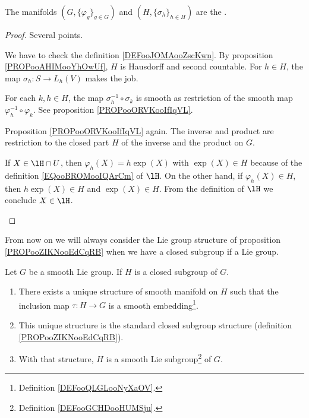 \begin{propositionDef}
	The manifolds \( (G,\{ \varphi_g \}_{g\in G})\) and \( (H,\{ \sigma_h \}_{h\in H})\) are the .
\end{propositionDef}

\begin{proof}
	Several points.
	\begin{subproof}
		We have to check the definition \ref{DEFooJOMAooZscKwn}. By proposition \ref{PROPooAHIMooYhOwUf}, \( H\) is Hausdorff and second countable. For \( h\in H\), the map \(\sigma_h \colon S\to L_h(V)  \) makes the job.

		For each \( k,h\in H\), the map \( \sigma_h^{-1}\circ \sigma_k\) is smooth as restriction of the smooth map \( \varphi_h^{-1}\circ\varphi_k\). See proposition \ref{PROPooORVKooIfIqVL}.

		Proposition \ref{PROPooORVKooIfIqVL} again. The inverse and product are restriction to the closed part \( H\) of the inverse and the product on \( G\).

		If \( X\in \lH\cap U\), then \( \varphi_h(X)=h\exp(X)\) with \( \exp(X)\in H\) because of the definition \eqref{EQooBROMooIQArCm} of \( \lH\). On the other hand, if \( \varphi_h(X)\in H\), then \( h\exp(X)\in H\) and \( \exp(X)\in H\). From the definition of \( \lH\) we conclude \( X\in \lH\).
	\end{subproof}
\end{proof}

\begin{normaltext}
	From now on we will always consider the Lie group structure of proposition \ref{PROPooZIKNooEdCqRB} when we have a closed subgroup if a Lie group.
\end{normaltext}


\begin{theorem}     \label{THOooDEJHooVKJYBL}
	Let \( G\) be a smooth Lie group. If \( H\) is a closed subgroup of \( G\).
	\begin{enumerate}
		\item
		      There exists a unique structure of smooth manifold on \( H\) such that the inclusion map \( \tau\colon H\to G\) is a smooth embedding\footnote{Definition \ref{DEFooQLGLooNyXaOV}.}.
		\item		\label{ITEMooZYPUooLxuCbj}
		      This unique structure is the standard closed subgroup structure (definition \ref{PROPooZIKNooEdCqRB}).
		\item	\label{ITEMooZCFHooJJTLeg}
		      With that structure, \( H\) is a smooth Lie subgroup\footnote{Definition \ref{DEFooGCHDooHUMSju}.} of \( G\).
	\end{enumerate}
\end{theorem}

